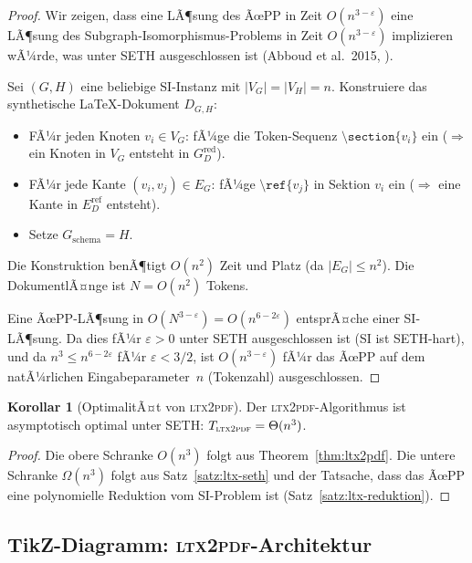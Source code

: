 ﻿\documentclass[a4paper,12pt]{article}
\theoremstyle{definition}
\newtheorem{korollar}{Korollar}
\begin{document}
\begin{proof}
	Wir zeigen, dass eine LÃ¶sung des ÃœPP in Zeit $O(n^{3-\varepsilon})$
	eine LÃ¶sung des Subgraph-Isomorphismus-Problems in Zeit
	$O(n^{3-\varepsilon})$ implizieren wÃ¼rde, was unter SETH ausgeschlossen
	ist (Abboud et al.\ 2015, \cite{abboud2015}).
	
	Sei $(G, H)$ eine beliebige SI-Instanz mit $|V_G| = |V_H| = n$.
	Konstruiere das synthetische \LaTeX-Dokument $D_{G,H}$:
	\begin{itemize}
		\item FÃ¼r jeden Knoten $v_i \in V_G$: fÃ¼ge die Token-Sequenz
		$\texttt{\textbackslash section\{$v_i$\}}$ ein
		($\Rightarrow$ ein Knoten in $V_G$ entsteht in $G_D^{\mathrm{red}}$).
		\item FÃ¼r jede Kante $(v_i, v_j) \in E_G$: fÃ¼ge
		$\texttt{\textbackslash ref\{$v_j$\}}$ in Sektion $v_i$ ein
		($\Rightarrow$ eine Kante in $E_D^{\mathrm{ref}}$ entsteht).
		\item Setze $G_{\mathrm{schema}} = H$.
	\end{itemize}
	Die Konstruktion benÃ¶tigt $O(n^2)$ Zeit und Platz (da $|E_G| \le n^2$).
	Die DokumentlÃ¤nge ist $N = O(n^2)$ Tokens.
	
	Eine ÃœPP-LÃ¶sung in $O(N^{3-\varepsilon}) = O(n^{6-2\varepsilon})$
	entsprÃ¤che einer SI-LÃ¶sung. Da dies fÃ¼r $\varepsilon > 0$ unter SETH
	ausgeschlossen ist (SI ist SETH-hart), und da $n^3 \le n^{6-2\varepsilon}$
	fÃ¼r $\varepsilon < 3/2$, ist $O(n^{3-\varepsilon})$ fÃ¼r das ÃœPP auf
	dem natÃ¼rlichen Eingabeparameter~$n$ (Tokenzahl) ausgeschlossen. 
\end{proof}

\begin{korollar}[OptimalitÃ¤t von \textsc{ltx2pdf}]
	\label{kor:ltx-optimal}
	Der \textsc{ltx2pdf}-Algorithmus ist asymptotisch optimal unter SETH:
	$T_{\textsc{ltx2pdf}} = \Theta(n^3)$.
\end{korollar}

\begin{proof}
	Die obere Schranke $O(n^3)$ folgt aus Theorem~\ref{thm:ltx2pdf}.
	Die untere Schranke $\Omega(n^3)$ folgt aus Satz~\ref{satz:ltx-seth}
	und der Tatsache, dass das ÃœPP eine polynomielle Reduktion vom SI-Problem
	ist (Satz~\ref{satz:ltx-reduktion}). 
\end{proof}

\subsection{TikZ-Diagramm: \textsc{ltx2pdf}-Architektur}
\label{sec:ltx-diagramm}
\end{document}
